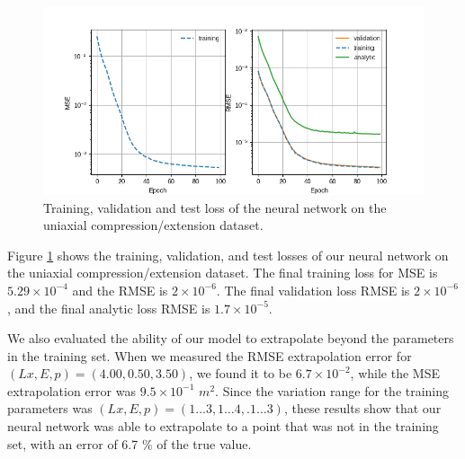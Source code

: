 \documentclass[oneside,a4paper,english,links]{amca}
\begin{document}
\begin{figure}[htpb!]
	\centering
	\includegraphics[width=1\textwidth]{Figures/Example1_losses.png}
	\caption{Training, validation and test loss of the neural network on the uniaxial compression/extension dataset.}
	\label{fig:train_loss}
	\end{figure}
 
Figure \ref{fig:train_loss} shows the training, validation, and test losses of our neural network on the uniaxial compression/extension dataset. The final training loss for MSE is $5.29\times10^{-4}$ and the RMSE is $2\times10^{-6}$. The final validation loss RMSE is $2\times10^{-6}$, and the final analytic loss RMSE is $1.7\times10^{-5}$.


We also evaluated the ability of our model to extrapolate beyond the parameters in the training set. When we measured the RMSE extrapolation error for $(Lx, E, p) = (4.00, 0.50, 3.50)$, we found it to be $6.7\times10^{-2}$, while the MSE extrapolation error was $9.5\times10^{-1}$ $m^2$. Since the variation range for the training parameters was $(Lx, E, p) = (1 \hdots 3, 1 \hdots 4, .1 \hdots 3)$, these results show that our neural network was able to extrapolate to a point that was not in the training set, with an error of 6.7 \% of the true value.
\end{document}
